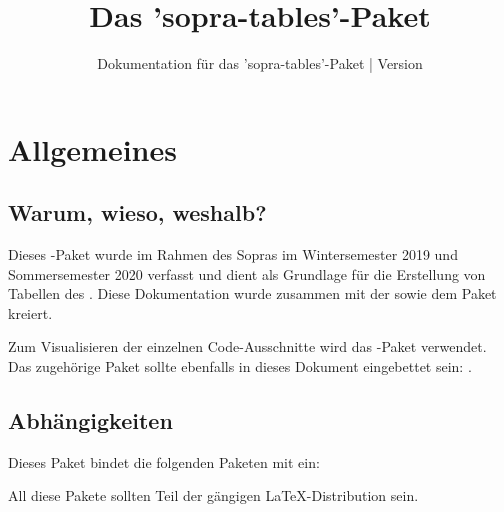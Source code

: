 \documentclass{sopra-base}
\title{Das 'sopra-tables'-Paket}
\subtitle[Dokumentation für das 'sopra-tables'-Paket]{Dokumentation für das 'sopra-tables'-Paket | Version \thesotversion}
\begin{document}
    \maketitle%
%
%

%
%
%
%

\section{Allgemeines}
\subsection{Warum, wieso, weshalb?}
    Dieses \LaTeXe-Paket wurde im Rahmen des Sopras im
    Wintersemester 2019 und Sommersemester 2020 verfasst und dient als
    Grundlage für die Erstellung von Tabellen
    des . Diese Dokumentation wurde zusammen mit der
     sowie dem Paket  kreiert.\par
    Zum Visualisieren der einzelnen Code-Ausschnitte wird das
    -Paket verwendet.
    Das zugehörige Paket sollte ebenfalls in dieses Dokument eingebettet sein: .
\subsection{Abhängigkeiten}
    Dieses Paket bindet die folgenden Paketen mit ein:
    \begin{multicols}{3}
    \end{multicols}
    All diese Pakete sollten Teil der gängigen \LaTeX-Distribution sein.
\end{document}
